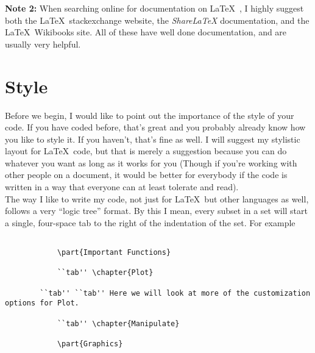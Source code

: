 \documentclass[11pt,letterpaper,twoside,titlepage]{article}
\newcommand{\latex}{\LaTeX \ }
\begin{document}
		\textbf{Note 2:}  When searching online for documentation on \latex, I highly suggest both the \latex stackexchange website, the \emph{ShareLaTeX} documentation, and the \latex Wikibooks site.  All of these have well done documentation, and are usually very helpful.
		
\newpage		
	
	\tableofcontents
	
\newpage	
	
	\section{Style}
	
		Before we begin, I would like to point out the importance of the style of your code.  If you have coded before, that's great and you probably already know how you like to style it.  If you haven't, that's fine as well.  I will suggest my stylistic layout for \latex code, but that is merely a suggestion because you can do whatever you want as long as it works for you (Though if you're working with other people on a document, it would be better for everybody if the code is written in a way that everyone can at least tolerate and read). \\
		
		The way I like to write my code, not just for \latex but other languages as well, follows a very ``logic tree'' format.  By this I mean, every subset in a set will start a single, four-space tab to the right of the indentation of the set.  For example
		
		\begin{verbatim}
		
			\part{Important Functions}
	
			``tab'' \chapter{Plot}

		``tab'' ``tab'' Here we will look at more of the customization options for Plot.
			
			``tab'' \chapter{Manipulate}
		
			\part{Graphics}
		\end{verbatim}
		
\end{document}
